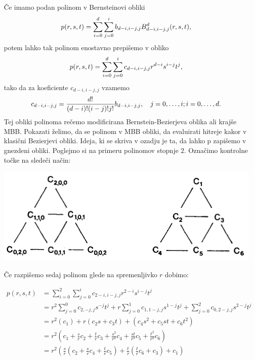 \documentclass{article}
\begin{document}
Če imamo podan polinom v Bernsteinovi obliki $$p(r,\\s,\\t) = \sum_{i=0}^{d}\sum_{j=0}^{i}b_{d-i,i-j,j}B_{d-i,i-j,j}^d(r,\\s,\\t),$$
potem lahko tak polinom enostavno prepišemo v obliko
$$p(r,\\s,\\t) = \sum_{i=0}^{d}\sum_{j=0}^{i}c_{d-i,i-j,j}r^{d-i}s^{i-j}t^j,$$
tako da za koeficiente $c_{d-i,i-j,j}$ vzamemo
$$c_{d-i,i-j,j} = \frac{d!}{(d-i)!(i-j)!j!}b_{d-i,i-j,j}, \quad j=0,\ldots, i;\\ i = 0,\ldots,d.$$
Tej obliki polinoma rečemo modificirana Bernstein-Bezierjeva oblika ali krajše MBB. Pokazati želimo, da se polinom v MBB obliki, da evaluirati hitreje kakor v klasični Bezierjevi obliki. Ideja, ki se skriva v ozadju je ta, da lahko p zapišemo v gnezdeni obliki. Poglejmo si na primeru polinomov stopnje $2$. Označimo kontrolne točke na sledeči način:

\begin{center}
\includegraphics[width=.9\linewidth]{graf.png}
\end{center}

Če razpišemo sedaj polinom glede na spremenljivko $r$ dobimo:

\begin{align}
p(r,s,t) &= \sum_{i=0}^{2}\sum_{j=0}^{i}c_{2-i,i-j,j}r^{2-i}s^{i-j}t^j \nonumber \\ \nonumber
&= r^2\sum_{j=0}^{0}c_{2,-j,j}s^{-j}t^j + r\sum_{j=0}^{1}c_{1,1-j,j}s^{1-j}t^j + \sum_{j=0}^{2}c_{0,2-j,j}s^{2-j}t^j \\ \nonumber
&= r^2(c_1) + r(c_2s+c_3t) + (c_4s^2+c_5st+c_6t^2)\\ \nonumber
&= r^2(c_1+\frac{s}{r}c_2+\frac{t}{r}c_3+\frac{s^2}{r^2}c_4+\frac{st}{r^2}c_5+\frac{t^2}{r^2}c_6) \\ \nonumber
&= r^2(\frac{s}{r}(c_2+\frac{s}{r}c_4+\frac{t}{r}c_5)+\frac{t}{r}(\frac{t}{r}c_6+c_3)+c_1) \nonumber
\end{align}
\end{document}
